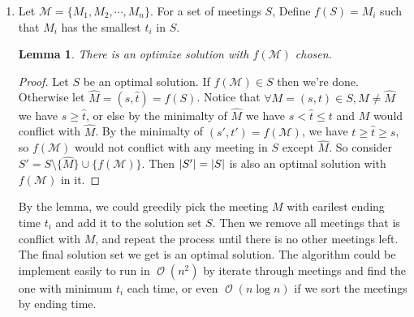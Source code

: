 \documentclass[12pt, a4paper]{article}
\DeclarePairedDelimiter{\abs}{\lvert}{\rvert}
\newcommand{\opord}{\operatorname{\mathcal{O}}}
\newcommand{\ord}[1]{\opord\left(#1\right)}
\newtheorem{lemma}{Lemma}
\begin{document}
\begin{enumerate}
\begin{figure}[H]
    \end{figure}
  \item 
    Let $\mathcal{M} = \{M_1, M_2, \cdots, M_n\}$. For a set of meetings $S$, Define $f(S) = M_i$ such that $M_i$ has the 
    smallest $t_i$ in $S$.

    \begin{lemma}
      There is an optimize solution with $f(\mathcal{M})$ chosen.
    \end{lemma}%
    \begin{proof}
      Let $S$ be an optimal solution. If $f(\mathcal{M}) \in S$ then we're done. Otherwise let 
      $\hat{M} = (\hat{s}, \hat{t}) = f(S)$. Notice that $\forall M = (s, t) \in S, M \neq \hat{M}$ 
      we have $s \geq \hat{t}$, or else by the minimalty of $\hat{M}$ we have $s < \hat{t} \leq t$ and 
      $M$ would conflict with $\hat{M}$. 
      By the minimalty of $(s', t') = f(\mathcal{M})$, we have $t \geq \hat{t} \geq s$, so $f(\mathcal{M})$
      would not conflict with any meeting in $S$ except $\hat{M}$.
      So consider $S' = S \setminus \{\hat{M}\} \cup \{f(\mathcal{M})\}$. 
      Then $\abs{S'} = \abs{S}$ is also an optimal solution with $f(\mathcal{M})$ in it.
    \end{proof}

    By the lemma, we could greedily pick the meeting $M$ with earilest ending time $t_i$ and add it to the
    solution set $S$. Then we remove all meetings that is conflict with $M$, and repeat the process until
    there is no other meetings left. The final solution set we get is an optimal solution. The algorithm
    could be implement easily to run in $\ord{n^2}$ by iterate through meetings and find the one with minimum $t_i$
    each time, or even $\ord{n \log n}$ if we sort the meetings by ending time.
\end{enumerate}
\end{document}
